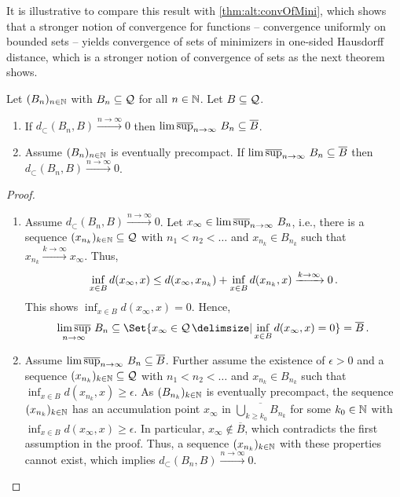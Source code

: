 %
It is illustrative to compare this result with \autoref{thm:alt:convOfMini}, which shows that a stronger notion of convergence for functions -- convergence uniformly on bounded sets -- yields convergence of sets of minimizers in one-sided Hausdorff distance, which is a stronger notion of convergence of sets as the next theorem shows.
%
\begin{theorem}\label{thm:outerVsHaus}
	Let $(B_n)_{n\in\mathbb{N}}$ with $B_n \subseteq \mathcal{Q}$ for all $n\in\mathbb{N}$. Let $B \subseteq \mathcal{Q}$.
	\begin{enumerate}[label=(\roman*)]
		\item If $d_{\subset}(B_n, B) \xrightarrow{n\to\infty} 0$ then $\operatorname*{lim\, \overline{sup}}_{n\to\infty}\, B_n \subseteq \overline{B}$.
		\item Assume $(B_n)_{n\in\mathbb{N}}$ is eventually precompact. If $\operatorname*{lim\, \overline{sup}}_{n\to\infty}\, B_n \subseteq \overline{B}$ then $d_{\subset}(B_n, B) \xrightarrow{n\to\infty} 0$.
	\end{enumerate}	
\end{theorem}
%
%
\begin{proof}
	\mbox{ }
	\begin{enumerate}[label=(\roman*)]
\item 
	Assume $d_{\subset}(B_n, B) \xrightarrow{n\to\infty} 0$. Let $x_\infty \in \operatorname*{lim\, \overline{sup}}_{n\to\infty}\, B_n$, i.e., there is a sequence $(x_{n_k})_{k\in\mathbb{N}}\subseteq \mathcal{Q}$ with $n_1 < n_2 < \dots$ and $x_{n_k}\in B_{n_k}$ such that $x_{n_k} \xrightarrow{k\to\infty} x_\infty$. Thus, 
	\begin{equation*}
		\inf_{x\in B} d(x_\infty, x) \leq d(x_\infty, x_{n_k}) + \inf_{x\in B} d(x_{n_k}, x)  \xrightarrow{k\to\infty} 0\, .
	\end{equation*}
	This shows $\inf_{x\in B} d(x_\infty, x) = 0$. Hence,
	\begin{equation*}
		\outerlim_{n\to\infty}\,B_n \subset \Set{x_\infty \in \MS \given \inf_{x\in B} d(x_\infty, x) = 0} = \overline{B}\eqfs
	\end{equation*}
\item	
	Assume  $\operatorname*{lim\, \overline{sup}}_{n\to\infty}\, B_n \subseteq \overline{B}$. Further assume the existence of $\epsilon>0$ and a sequence $(x_{n_k})_{k\in\mathbb{N}}\subseteq \mathcal{Q}$ with $n_1 < n_2 < \dots$ and $x_{n_k}\in B_{n_k}$ such that $\inf_{x\in B} d(x_{n_k}, x) \geq \epsilon$. As $(B_{n_k})_{k\in\mathbb{N}}$ is eventually precompact, the sequence $(x_{n_k})_{k\in\mathbb{N}}$ has an accumulation point $x_\infty$ in $\overline{\bigcup_{k \geq k_0} B_{n_k}}$ for some $k_0\in\mathbb{N}$ with $\inf_{x\in B} d(x_{\infty}, x) \geq \epsilon$. In particular, $x_{\infty} \not\in \overline{B}$, which contradicts the first assumption in the proof. Thus, a sequence $(x_{n_k})_{k\in\mathbb{N}}$ with these properties cannot exist, which implies $d_{\subset}(B_n, B) \xrightarrow{n\to\infty} 0$.
	\end{enumerate}
\end{proof}
